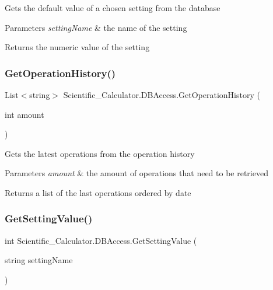 Gets the default value of a chosen setting from the database 


\begin{DoxyParams}{Parameters}
{\em setting\+Name} & the name of the setting\\
\hline
\end{DoxyParams}
\begin{DoxyReturn}{Returns}
the numeric value of the setting
\end{DoxyReturn}
\mbox{\label{class_scientific___calculator_1_1_d_b_access_a0082501ed3f21914f17be60e4a7541b3}} 
\subsubsection{\texorpdfstring{Get\+Operation\+History()}{GetOperationHistory()}}
{\footnotesize\ttfamily List$<$string$>$ Scientific\+\_\+\+Calculator.\+D\+B\+Access.\+Get\+Operation\+History (\begin{DoxyParamCaption}\item[{int}]{amount }\end{DoxyParamCaption})}



Gets the latest operations from the operation history 


\begin{DoxyParams}{Parameters}
{\em amount} & the amount of operations that need to be retrieved\\
\hline
\end{DoxyParams}
\begin{DoxyReturn}{Returns}
a list of the last operations ordered by date
\end{DoxyReturn}
\mbox{\label{class_scientific___calculator_1_1_d_b_access_a738341bafa087495fe4c940ef3c74517}} 
\subsubsection{\texorpdfstring{Get\+Setting\+Value()}{GetSettingValue()}}
{\footnotesize\ttfamily int Scientific\+\_\+\+Calculator.\+D\+B\+Access.\+Get\+Setting\+Value (\begin{DoxyParamCaption}\item[{string}]{setting\+Name }\end{DoxyParamCaption})}



